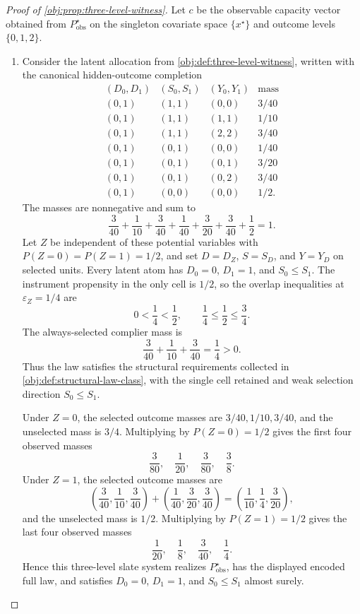 \documentclass[11pt]{article}
\begin{document}
\begin{proof}[Proof of \cref{obj:prop:three-level-witness}]
Let \(c\) be the observable capacity vector obtained from \(P_{\mathrm{obs}}^{\star}\) on the singleton covariate space \(\{x^{\star}\}\) and outcome levels \(\{0,1,2\}\).

\begin{enumerate}
\item Consider the latent allocation from \cref{obj:def:three-level-witness}, written with the canonical hidden-outcome completion
\[
\begin{array}{c|c|c|c}
(D_0,D_1) & (S_0,S_1) & (Y_0,Y_1) & \text{mass}\\ \hline
(0,1)&(1,1)&(0,0)&3/40\\
(0,1)&(1,1)&(1,1)&1/10\\
(0,1)&(1,1)&(2,2)&3/40\\
(0,1)&(0,1)&(0,0)&1/40\\
(0,1)&(0,1)&(0,1)&3/20\\
(0,1)&(0,1)&(0,2)&3/40\\
(0,1)&(0,0)&(0,0)&1/2 .
\end{array}
\]
The masses are nonnegative and sum to
\[
\frac{3}{40}+\frac{1}{10}+\frac{3}{40}
+\frac{1}{40}+\frac{3}{20}+\frac{3}{40}
+\frac12
=
1.
\]
Let \(Z\) be independent of these potential variables with
\(P(Z=0)=P(Z=1)=1/2\), and set \(D=D_Z\), \(S=S_D\), and \(Y=Y_D\) on selected units.  Every latent atom has \(D_0=0\), \(D_1=1\), and \(S_0\le S_1\).  The instrument propensity in the only cell is \(1/2\), so the overlap inequalities at \(\varepsilon_Z=1/4\) are
\[
0<\frac14<\frac12,
\qquad
\frac14\le \frac12\le \frac34 .
\]
The always-selected complier mass is
\[
\frac{3}{40}+\frac{1}{10}+\frac{3}{40}=\frac14>0.
\]
Thus the law satisfies the structural requirements collected in \cref{obj:def:structural-law-class}, with the single cell retained and weak selection direction \(S_0\le S_1\).

Under \(Z=0\), the selected outcome masses are \(3/40,1/10,3/40\), and the unselected mass is \(3/4\).  Multiplying by \(P(Z=0)=1/2\) gives the first four observed masses
\[
\frac{3}{80},\quad \frac{1}{20},\quad \frac{3}{80},\quad \frac38 .
\]
Under \(Z=1\), the selected outcome masses are
\[
\left(\frac{3}{40},\frac{1}{10},\frac{3}{40}\right)
+
\left(\frac{1}{40},\frac{3}{20},\frac{3}{40}\right)
=
\left(\frac{1}{10},\frac14,\frac{3}{20}\right),
\]
and the unselected mass is \(1/2\).  Multiplying by \(P(Z=1)=1/2\) gives the last four observed masses
\[
\frac{1}{20},\quad \frac18,\quad \frac{3}{40},\quad \frac14 .
\]
Hence this three-level slate system realizes \(P_{\mathrm{obs}}^{\star}\), has the displayed encoded full law, and satisfies \(D_0=0\), \(D_1=1\), and \(S_0\le S_1\) almost surely. %


\end{enumerate}
\end{proof}
\end{document}
